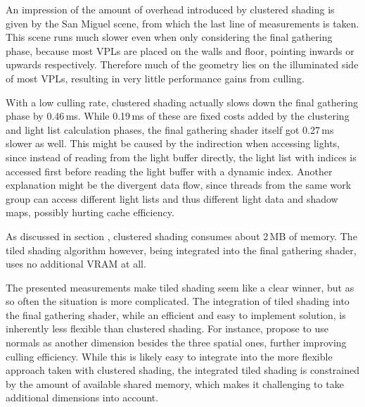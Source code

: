 An impression of the amount of overhead introduced by clustered shading is given by the San Miguel scene, from which the last line of measurements is taken. This scene runs much slower even when only considering the final gathering phase, because most VPLs are placed on the walls and floor, pointing inwards or upwards respectively. Therefore much of the geometry lies on the illuminated side of most VPLs, resulting in very little performance gains from culling.

With a low culling rate, clustered shading actually slows down the final gathering phase by 0.46\,ms. While 0.19\,ms of these are fixed costs added by the clustering and light list calculation phases, the final gathering shader itself got 0.27\,ms slower as well. This might be caused by the indirection when accessing lights, since instead of reading from the light buffer directly, the light list with indices is accessed first before reading the light buffer with a dynamic index. Another explanation might be the divergent data flow, since threads from the same work group can access different light lists and thus different light data and shadow maps, possibly hurting cache efficiency.

As discussed in section , clustered shading consumes about 2\,MB of memory. The tiled shading algorithm however, being integrated into the final gathering shader, uses no additional VRAM at all.

The presented measurements make tiled shading seem like a clear winner, but as so often the situation is more complicated. The integration of tiled shading into the final gathering shader, while an efficient and easy to implement solution, is inherently less flexible than clustered shading. For instance, \citet{olsson2012clustered} propose to use normals as another dimension besides the three spatial ones, further improving culling efficiency. While this is likely easy to integrate into the more flexible approach taken with clustered shading, the integrated tiled shading is constrained by the amount of available shared memory, which makes it challenging to take additional dimensions into account.
